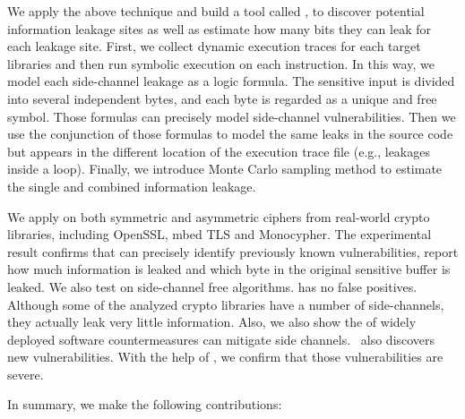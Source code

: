 We apply the above technique and build a tool called \tool{},
to discover potential information leakage sites as well as estimate how
many bits they can leak for each leakage site. 
First, we collect dynamic execution traces for each target
libraries and then run symbolic execution on each instruction. In this way, we model
each side-channel leakage as a logic formula. The sensitive input is divided into
several independent bytes, and each byte is regarded as a unique and free symbol. Those
formulas can precisely model side-channel vulnerabilities. Then we use the conjunction
of those formulas to model the same leaks in the source code but appears in the different location of
the execution trace file (e.g., leakages inside a loop).
Finally, we introduce Monte Carlo
sampling method to estimate the single and combined information leakage. 

We apply \tool{} on both symmetric and asymmetric ciphers from real-world crypto
libraries, including OpenSSL, mbed TLS and Monocypher\@. The experimental result confirms
that \tool{} can precisely identify previously known vulnerabilities, report
how much information is leaked and which byte in the original sensitive buffer
is leaked. We also test \tool{} on side-channel free algorithms. \tool{} has no
false positives.
Although some of the analyzed crypto libraries have a number of
side-channels, they actually leak very little information. Also, we also show the
of widely deployed software countermeasures can mitigate side channels.
\tool\ also discovers new vulnerabilities. With the help of \tool{}, we confirm
that those vulnerabilities are severe.

In summary, we make the following contributions:

